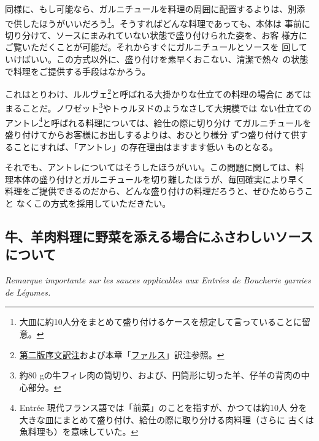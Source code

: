 同様に、もし可能なら、ガルニチュールを料理の周囲に配置するよりは、別添
で供したほうがいいだろう\footnote{大皿に約10人分をまとめて盛り付けるケースを想定して言っていることに留意。}。そうすればどんな料理であっても、本体は
事前に切り分けて、ソースにまみれていない状態で盛り付けられた姿を、お客
様方にご覧いただくことが可能だ。それからすぐにガルニチュールとソースを
回していけばいい。この方式以外に、盛り付けを素早くおこない、清潔で熱々
の状態で料理をご提供する手段はなかろう。

これはとりわけ、ルルヴェ\footnote{\protect\hyperlink{releve}{第二版序文訳注}および本章「\protect\hyperlink{farces}{ファルス}」訳注参照。}と呼ばれる大掛かりな仕立ての料理の場合に
あてはまることだ。ノワゼット\footnote{約80
  gの牛フィレ肉の筒切り、および、円筒形に切った羊、仔羊の背肉の中心部分。}やトゥルヌドのようなさして大規模では
ない仕立てのアントレ\footnote{Entrée
  現代フランス語では「前菜」のことを指すが、かつては約10人
  分を大きな皿にまとめて盛り付け、給仕の際に取り分ける肉料理（さらに
  古くは魚料理も）を意味していた。}と呼ばれる料理については、給仕の際に切り分け
てガルニチュールを盛り付けてからお客様にお出しするよりは、おひとり様分
ずつ盛り付けて供することにすれば、「アントレ」の存在理由はますます低い
ものとなる。

それでも、アントレについてはそうしたほうがいい。この問題に関しては、料
理本体の盛り付けとガルニチュールを切り離したほうが、毎回確実により早く
料理をご提供できるのだから、どんな盛り付けの料理だろうと、ぜひためらうこと
なくこの方式を採用していただきたい。

\hypertarget{remarque-importante-sur-les-sauces-applicables-aux-entrees-de-boucherie-garnie-de-legumes}{%
\subsection{牛、羊肉料理に野菜を添える場合にふさわしいソースについて}\label{remarque-importante-sur-les-sauces-applicables-aux-entrees-de-boucherie-garnie-de-legumes}}

\vspace{-1\zw}
\begin{center}
\textit{Remarque importante sur les sauces applicables aux Entrées de Boucherie garnies de Légumes.}
\end{center}


